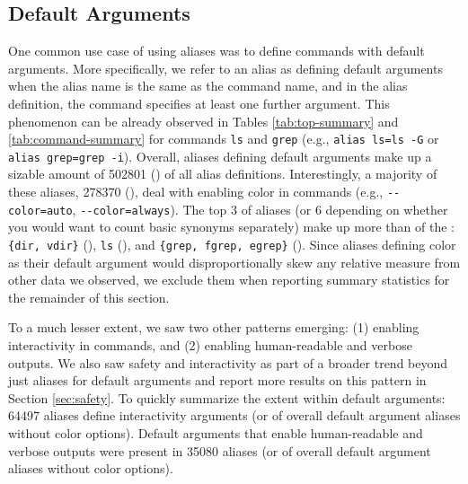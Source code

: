 \subsection{Default Arguments}

One common use case of using aliases was to define commands with default arguments.
More specifically, we refer to an alias as defining default arguments when the alias name is the same as the command name, and in the alias definition, the command specifies at least one further argument.
This phenomenon can be already observed in Tables \ref{tab:top-summary} and \ref{tab:command-summary} for commands \verb|ls| and \verb|grep| (e.g., \verb|alias ls=ls -G| or \verb|alias grep=grep -i|).
Overall, aliases defining default arguments make up a sizable amount of \num{502801} () of all alias definitions. 
Interestingly, a majority of these aliases, \num{278370} (), deal with enabling color in commands (e.g., \verb|--color=auto|, \verb|--color=always|).
The top 3 of aliases (or 6 depending on whether you would want to count basic synonyms separately) make up more than  of the : \verb|{dir, vdir}| (), \verb|ls| (), and \verb|{grep, fgrep, egrep}| ().
Since aliases defining color as their default argument would disproportionally skew any relative measure from other data we observed, we exclude them when reporting summary statistics for the remainder of this section.

To a much lesser extent, we saw two other patterns emerging: (1) enabling interactivity in commands, and (2) enabling human-readable and verbose outputs.
We also saw safety and interactivity as part of a broader trend beyond just aliases for default arguments and report more results on this pattern in Section \ref{sec:safety}.
To quickly summarize the extent within default arguments: \num{64497} aliases define interactivity arguments (or  of overall default argument aliases without color options).
Default arguments that enable human-readable and verbose outputs were present in \num{35080} aliases (or  of overall default argument aliases without color options).

